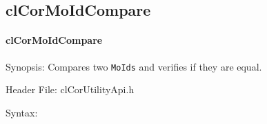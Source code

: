 \begin{flushleft}
\subsection{clCorMoIdCompare}
\hypertarget{pagecor128}{}\paragraph{cl\-Cor\-MoId\-Compare}\label{pagecor128}
\begin{Desc}
\item[Synopsis:]Compares two {\tt{MoIds}} and verifies if they are equal.\end{Desc}
\begin{Desc}
\item[Header File:]clCorUtilityApi.h\end{Desc}
\begin{Desc}
\item[Syntax:]


\end{Desc}
\end{flushleft}
